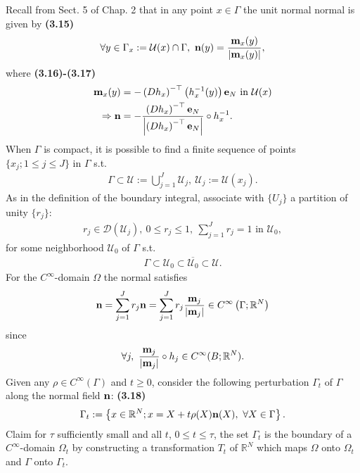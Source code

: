 \documentclass{book}
\numberwithin{equation}{section}
\begin{document}
\begin{enumerate}
\begin{enumerate}
        Recall from Sect. 5 of Chap. 2 that in any point $x\in\Gamma$ the unit normal normal is given by \textbf{(3.15)}
        \begin{align*}
            \forall y\in\Gamma_x := \mathcal{U}(x)\cap\Gamma,\ {\bf n}(y) = \frac{{\bf m}_x(y)}{\left|{\bf m}_x(y)\right|},
        \end{align*}
        where \textbf{(3.16)-(3.17)}
        \begin{align*}
            {\bf m}_x(y) &= -\left(Dh_x\right)^{-\top}\left(h_x^{-1}(y)\right){\bf e}_N \mbox{ in } \mathcal{U}(x)\\
            \Rightarrow{\bf n} &= -\frac{\left(Dh_x\right)^{-\top}{\bf e}_N}{\left|\left(Dh_x\right)^{-\top}{\bf e}_N\right|}\circ h_x^{-1}.
        \end{align*}
        When $\Gamma$ is compact, it is possible to find a finite sequence of points $\{x_j;1\le j\le J\}$ in $\Gamma$ s.t.
        \begin{align*}
            \Gamma\subset\mathcal{U} := \bigcup_{j=1}^J \mathcal{U}_j,\ \mathcal{U}_j := \mathcal{U}(x_j).
        \end{align*}
        As in the definition of the boundary integral, associate with $\{U_j\}$ a partition of unity $\{r_j\}$:
        \begin{align*}
            r_j\in\mathcal{D}\left(\mathcal{U}_j\right),\ 0\le r_j\le 1,\ \sum_{j=1}^J r_j = 1 \mbox{ in } \mathcal{U}_0,
        \end{align*}
        for some neighborhood $\mathcal{U}_0$ of $\Gamma$ s.t.
        \begin{align*}
            \Gamma\subset\mathcal{U}_0\subset\overline{\mathcal{U}_0}\subset\mathcal{U}.
        \end{align*}
        For the $C^\infty$-domain $\Omega$ the normal satisfies
        \begin{align*}
            {\bf n} = \sum_{j=1}^J r_j{\bf n} = \sum_{j=1}^J r_j\frac{{\bf m}_j}{\left|{\bf m}_j\right|}\in C^\infty\left(\Gamma;\mathbb{R}^N\right)
        \end{align*}
        since
        \begin{align*}
            \forall j,\ \frac{{\bf m}_j}{\left|{\bf m}_j\right|}\circ h_j\in C^\infty(B;\mathbb{R}^N).
        \end{align*}
        Given any $\rho\in C^\infty(\Gamma)$ and $t\ge 0$, consider the following perturbation $\Gamma_t$ of $\Gamma$ along the normal field ${\bf n}$: \textbf{(3.18)}
        \begin{align*}
            \Gamma_t := \left\{x\in\mathbb{R}^N;x = X + t\rho(X){\bf n}(X),\ \forall X\in\Gamma\right\}.
        \end{align*}
        Claim for $\tau$ sufficiently small and all $t$, $0\le t\le\tau$, the set $\Gamma_t$ is the boundary of a $C^\infty$-domain $\Omega_t$ by constructing a transformation $T_t$ of $\mathbb{R}^N$ which maps $\Omega$ onto $\Omega_t$ and $\Gamma$ onto $\Gamma_t$.
        

\end{enumerate}
\end{enumerate}
\end{document}
